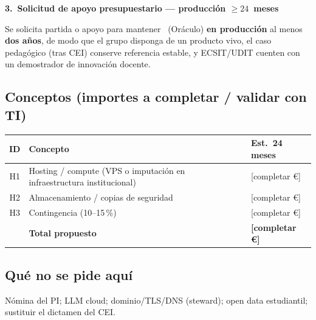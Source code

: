 \documentclass[11pt,a4paper]{scrartcl}
\newcommand{\AnnexTitle}[1]{%
  \clearpage
  \LogoRow
  \begin{center}{\Large\sffamily\bfseries #1}\end{center}
  \vspace{0.4em}
  \noindent{\color{rulegray}\hrule height 0.4pt}
  \vspace{0.5em}
}
\begin{document}
\AnnexTitle{3.\ Solicitud de apoyo presupuestario --- producción $\geq 24$~meses}

\noindent Se solicita partida o apoyo para mantener \TTODfull\ (Oráculo)
\textbf{en producción} al menos \textbf{dos años}, de modo que el grupo disponga
de un producto vivo, el caso pedagógico (tras CEI) conserve referencia estable, y
ECSIT/UDIT cuenten con un demostrador de innovación docente.

\subsection*{Conceptos (importes a completar / validar con TI)}
\renewcommand{\arraystretch}{1.25}
\begin{tabularx}{\textwidth}{@{}c>{\raggedright\arraybackslash}X>{\raggedright\arraybackslash}p{3.6cm}@{}}
  \toprule
  \textbf{ID} & \textbf{Concepto} & \textbf{Est.~24 meses} \\
  \midrule
  H1 & Hosting / compute (VPS o imputación en infraestructura institucional) & {[}completar €{]} \\
  H2 & Almacenamiento / copias de seguridad & {[}completar €{]} \\
  H3 & Contingencia (10--15\,\%) & {[}completar €{]} \\
  \midrule
  & \textbf{Total propuesto} & \textbf{{[}completar €{]}} \\
  \bottomrule
\end{tabularx}

\vspace{0.35em}

\vspace{0.45em}

\subsection*{Qué no se pide aquí}
Nómina del PI; LLM cloud; dominio/TLS/DNS (steward); open data estudiantil;
sustituir el dictamen del CEI.
\end{document}
